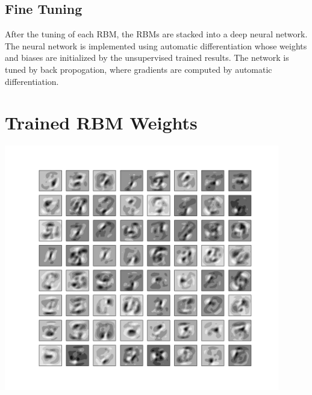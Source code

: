 \documentclass[a4paper,onecolumn]{article}
\theoremstyle{remark}
\begin{document}
\subsection{Fine Tuning}
After the tuning of each RBM, the RBMs are stacked into a deep neural network. 
The neural network is implemented using automatic
differentiation whose weights and biases are initialized by the unsupervised trained results.
The network is tuned by back propogation, where gradients are computed by automatic differentiation.

\section{Trained RBM Weights}
\begin{center}
    \includegraphics[width=12cm]{png/weight.png}
\end{center}
\end{document}
